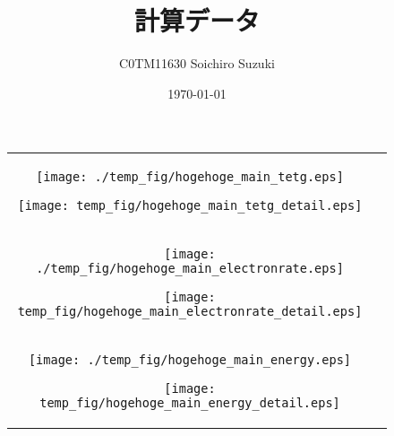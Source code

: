 \documentclass{jsarticle}
\title{計算データ}
\author{C0TM11630 Soichiro Suzuki}
\date{\today}
\begin{document}
\maketitle

\begin{figure}[htbp]
    \begin{center}
    \begin{tabular}{cc}

       \begin{minipage}{0.5\hsize}
       \begin{center}
          \texttt{[image: ./temp\_fig/hogehoge\_main\_tetg.eps]}
          \hspace{1.6 cm} 
       \end{center}
       \end{minipage}
    
       \begin{minipage}{0.5\hsize}
          \begin{center}
             \texttt{[image: temp\_fig/hogehoge\_main\_tetg\_detail.eps]}
          \end{center}
       \end{minipage}
       \\
       \begin{minipage}{0.5\hsize}
        \begin{center}
           \texttt{[image: ./temp\_fig/hogehoge\_main\_electronrate.eps]}
           \hspace{1.6 cm} 
        \end{center}
        \end{minipage}
     
        \begin{minipage}{0.5\hsize}
           \begin{center}
              \texttt{[image: temp\_fig/hogehoge\_main\_electronrate\_detail.eps]}
           \end{center}
        \end{minipage}
        \\
        \begin{minipage}{0.5\hsize}
            \begin{center}
               \texttt{[image: ./temp\_fig/hogehoge\_main\_energy.eps]}
               \hspace{1.6 cm} 
            \end{center}
            \end{minipage}
         
            \begin{minipage}{0.5\hsize}
               \begin{center}
                  \texttt{[image: temp\_fig/hogehoge\_main\_energy\_detail.eps]}
               \end{center}
            \end{minipage}
    
    \end{tabular}
    \end{center}
    \label{fig:upwind}
    \clearpage
   \end{figure}
\end{document}
